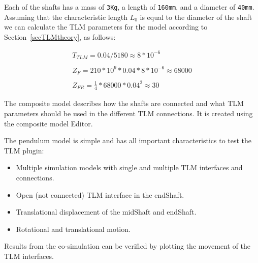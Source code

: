 Each of the shafts has a mass of {\tt 3Kg}, a length of {\tt 160mm}, and a diameter of {\tt 40mm}. 
Assuming that the characteristic length $L_0$ is equal to the diameter of the shaft we can calculate the TLM parameters for the model according to Section~\ref{secTLMtheory}, as follows:

\begin{equation}
\begin{array}{l}
T_{TLM} =  0.04/5180 \approx 8*10^{-6} \\
\\
Z_F =  210*10^{9} * 0.04 * 8*10^{-6} \approx 68000 \\
\\
Z_{FR} =  \frac{1}{4}*68000*0.04^2 \approx 30
\end{array}
\end{equation}

The composite model describes how the shafts are connected and what TLM parameters should be used in the different TLM connections. 
It is created using the composite model Editor.

The pendulum model is simple and has all important characteristics to test the TLM plugin:
\begin{itemize}
\item Multiple simulation models with single and multiple TLM interfaces and connections.
\item Open (not connected) TLM interface in the endShaft.
\item Translational displacement of the midShaft and endShaft.
\item Rotational and translational motion.
\end{itemize}

Results from the co-simulation can be verified by plotting the movement of the TLM interfaces.

